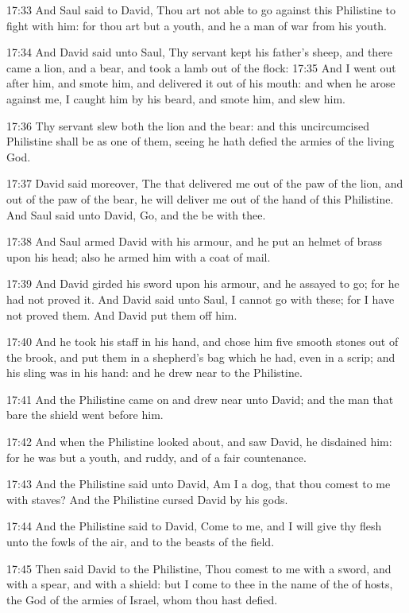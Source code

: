 17:33 And Saul said to David, Thou art not able to go against this
Philistine to fight with him: for thou art but a youth, and he a man
of war from his youth.

17:34 And David said unto Saul, Thy servant kept his father's sheep,
and there came a lion, and a bear, and took a lamb out of the flock:
17:35 And I went out after him, and smote him, and delivered it out of
his mouth: and when he arose against me, I caught him by his beard,
and smote him, and slew him.

17:36 Thy servant slew both the lion and the bear: and this
uncircumcised Philistine shall be as one of them, seeing he hath
defied the armies of the living God.

17:37 David said moreover, The \LORD that delivered me out of the paw
of the lion, and out of the paw of the bear, he will deliver me out of
the hand of this Philistine. And Saul said unto David, Go, and the
\LORD be with thee.

17:38 And Saul armed David with his armour, and he put an helmet of
brass upon his head; also he armed him with a coat of mail.

17:39 And David girded his sword upon his armour, and he assayed to
go; for he had not proved it. And David said unto Saul, I cannot go
with these; for I have not proved them. And David put them off him.

17:40 And he took his staff in his hand, and chose him five smooth
stones out of the brook, and put them in a shepherd's bag which he
had, even in a scrip; and his sling was in his hand: and he drew near
to the Philistine.

17:41 And the Philistine came on and drew near unto David; and the man
that bare the shield went before him.

17:42 And when the Philistine looked about, and saw David, he
disdained him: for he was but a youth, and ruddy, and of a fair
countenance.

17:43 And the Philistine said unto David, Am I a dog, that thou comest
to me with staves? And the Philistine cursed David by his gods.

17:44 And the Philistine said to David, Come to me, and I will give
thy flesh unto the fowls of the air, and to the beasts of the field.

17:45 Then said David to the Philistine, Thou comest to me with a
sword, and with a spear, and with a shield: but I come to thee in the
name of the \LORD of hosts, the God of the armies of Israel, whom thou
hast defied.

